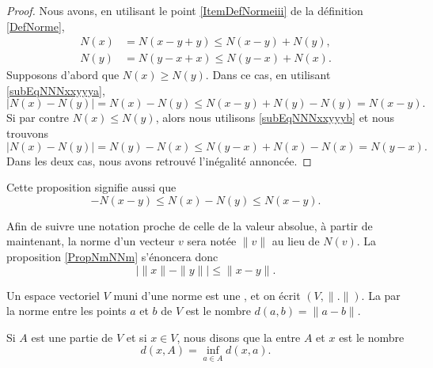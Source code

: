 \begin{proof}
	Nous avons, en utilisant le point \ref{ItemDefNormeiii} de la définition \ref{DefNorme},
	\begin{subequations}
		\begin{align}
			N(x)&=N(x-y+y)\leq N(x-y)+N(y),	\label{subEqNNNxxyyya}\\
			N(y)&=N(y-x+x)\leq N(y-x)+N(x).	\label{subEqNNNxxyyyb}
		\end{align}
	\end{subequations}
	Supposons d'abord que $N(x)\geq N(y)$. Dans ce cas, en utilisant \eqref{subEqNNNxxyyya},
	\begin{equation}
		\big| N(x)-N(y) \big|=N(x)-N(y)\leq N(x-y)+N(y)-N(y)=N(x-y).
	\end{equation}
	Si par contre $N(x)\leq N(y)$, alors nous utilisons \eqref{subEqNNNxxyyyb} et nous trouvons
	\begin{equation}
		\big| N(x)-N(y) \big|=N(y)-N(x)\leq N(y-x)+N(x)-N(x)=N(y-x).
	\end{equation}
	Dans les deux cas, nous avons retrouvé l'inégalité annoncée.
\end{proof}
Cette proposition signifie aussi que
\begin{equation}	\label{EqNleqNNleqNvqlqbs}
	-N(x-y)\leq N(x)-N(y)\leq N(x-y).
\end{equation}


Afin de suivre une notation proche de celle de la valeur absolue, à partir de maintenant, la norme d'un vecteur $v$ sera notée $\| v\|$ au lieu de $N(v)$. La proposition \ref{PropNmNNm} s'énoncera donc
\begin{equation}
\big| \| x \|-\| y \| \big|\leq \| x-y \|.
\end{equation}
\begin{definition}		\label{DefEVNetDistance}
	Un espace vectoriel $V$ muni d'une norme est une , et on écrit $(V,\| . \|)$. La  par la norme entre les points $a$ et $b$ de $V$ est le nombre $d(a,b)=\| a-b \|$.

	Si $A$ est une partie de $V$ et si $x\in V$, nous disons que la  entre $A$ et $x$ est le nombre
	\begin{equation}		\label{EqdefDistaA}
		d(x,A)=\inf_{a\in A}d(x,a).
	\end{equation}
\end{definition}
\newcommand{\CaptionFigDistanceEnsemble}{La distance entre $x$ et $A$ est donnée par la distance entre $x$ et $p$. Les distances entre $x$ et les autres points de $A$ sont plus grandes que $d(x,p)$.}



